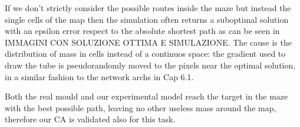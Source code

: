\par
If we don't strictly consider the possible routes inside the maze but instead the single cells of the map then the simulation often returns a suboptimal solution with an epsilon error respect to the absolute shortest path as can be seen in IMMAGINI CON SOLUZIONE OTTIMA E SIMULAZIONE. The cause is the distribution of mass in cells instead of a continuos space: the gradient used to draw the tube is pseudorandomly moved to the pixels near the optimal solution, in a similar fashion to the network archs in Cap 6.1.

\par
Both the real mould and our experimental model reach the target in the maze with the best possible path, leaving no other useless mass around the map, therefore our CA is validated also for this task.
